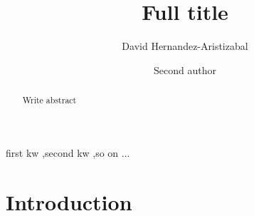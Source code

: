 \documentclass[numbers,sort&compress,times,review,3p,12pt]{elsarticle}
\title{Full title}
\author[1]{David Hernandez-Aristizabal\corref{cor1}}
\author[2]{Second author}
\begin{document}
\makeatletter
\def\ps@pprintTitle{%
 \let\@oddhead\@empty
 \let\@evenhead\@empty
 \def\@oddfoot{}%
 \let\@evenfoot\@oddfoot}
\makeatother

\begin{abstract}
    \begin{linenumbers}
    Write abstract
    \end{linenumbers}
\end{abstract}
\begin{keyword}
    first kw \sep second kw \sep so on ...
\end{keyword}

\maketitle
\linenumbers

\section{Introduction}



\end{document}
